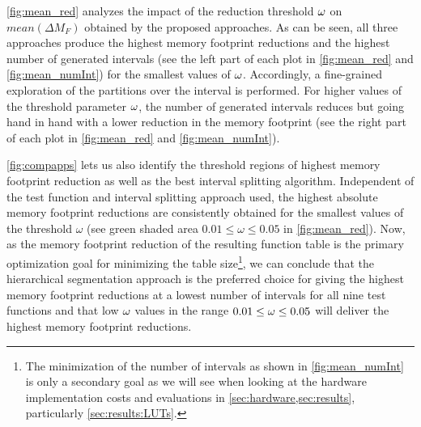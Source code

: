 \cref{fig:mean_red} analyzes the impact of the reduction threshold $\omega$ on $mean(\Delta M_F)$ obtained by the proposed approaches.  
As can be seen, all three approaches produce the highest memory footprint reductions and the highest number of generated intervals (see the left part of each plot in \cref{fig:mean_red} and \cref{fig:mean_numInt}) for the smallest values of $\omega$. 
Accordingly, a fine-grained exploration of the partitions over the interval is performed.
For higher values of the threshold parameter $\omega$, the number of generated intervals reduces but going hand in hand with a lower reduction in the memory footprint (see the right part of each plot in \cref{fig:mean_red} and \cref{fig:mean_numInt}).\par
\cref{fig:compapps} lets us also identify the threshold regions of highest memory footprint reduction as well as the best interval splitting algorithm. 
Independent of the test function and interval splitting approach used, the highest absolute memory footprint reductions are consistently obtained for the smallest values of the threshold $\omega$ (see green shaded area $0.01 \leq \omega \le 0.05$ in \cref{fig:mean_red}).
Now, as the memory footprint reduction of the resulting function table is the primary optimization goal for minimizing the table size\footnote{{The minimization of the number of intervals as shown in \cref{fig:mean_numInt} is only a secondary goal as we will see when looking at the hardware implementation costs and evaluations in \cref{sec:hardware,sec:results}, particularly \cref{sec:results:LUTs}.}}, we can conclude that the hierarchical segmentation approach is the preferred choice for giving the highest memory footprint reductions at a lowest number of intervals for all nine test functions and that low $\omega$ values in the range $0.01 \leq \omega \leq 0.05$ will deliver the highest memory footprint reductions.

